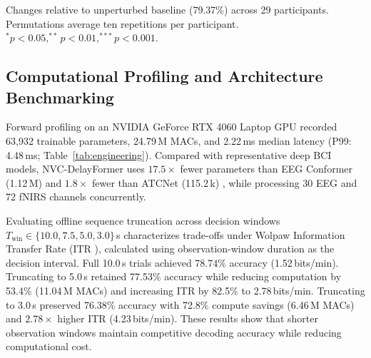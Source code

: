 \documentclass[journal]{IEEEtran}
\begin{document}
\begin{table}[!t]
\centering
\caption{Full-model performance under controlled test-input perturbations on the TU Berlin benchmark.}
\label{tab:perturb}
\par\smallskip
{\scriptsize Changes relative to unperturbed baseline (79.37\%) across 29 participants. Permutations average ten repetitions per participant. $^{*}p<0.05, ^{**}p<0.01, ^{***}p<0.001$.}
\end{table}


\subsection{Computational Profiling and Architecture Benchmarking}
Forward profiling on an NVIDIA GeForce RTX 4060 Laptop GPU recorded 63,932 trainable parameters, 24.79\,M MACs, and 2.22\,ms median latency (P99: 4.48\,ms; Table~\ref{tab:engineering}). Compared with representative deep BCI models, NVC-DelayFormer uses $17.5\times$ fewer parameters than EEG Conformer (1.12\,M) \cite{song2022eeg} and $1.8\times$ fewer than ATCNet (115.2\,k) \cite{altaheri2023atcnet}, while processing 30 EEG and 72 fNIRS channels concurrently.

Evaluating offline sequence truncation across decision windows $T_{\mathrm{win}} \in \{10.0, 7.5, 5.0, 3.0\}$\,s characterizes trade-offs under Wolpaw Information Transfer Rate (ITR \cite{wolpaw2002brain}), calculated using observation-window duration as the decision interval. Full 10.0\,s trials achieved 78.74\% accuracy (1.52\,bits/min). Truncating to 5.0\,s retained 77.53\% accuracy while reducing computation by 53.4\% (11.04\,M MACs) and increasing ITR by 82.5\% to 2.78\,bits/min. Truncating to 3.0\,s preserved 76.38\% accuracy with 72.8\% compute savings (6.46\,M MACs) and $2.78\times$ higher ITR (4.23\,bits/min). These results show that shorter observation windows maintain competitive decoding accuracy while reducing computational cost.
\end{document}

